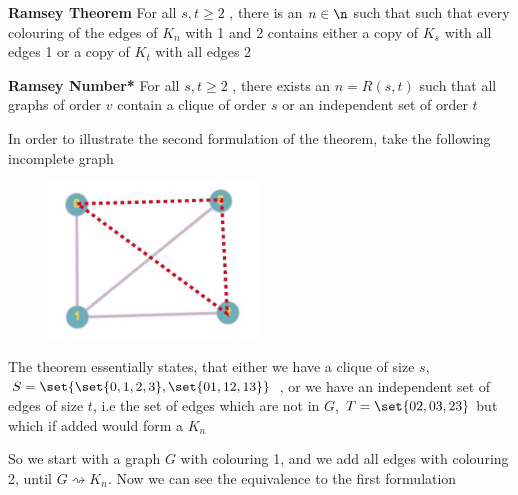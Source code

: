 \documentclass[english,course]{Notes}
\begin{document}
{{\begin{theorem}
\textbf{Ramsey Theorem} For all $s,t \geq 2$ , there is an $n \in \n$ such that such that every colouring of the edges of $K_{n}$ with 1 and 2 contains either a copy of $K_{s}$ with all edges 1 or a copy of $K_{t}$ with all edges 2
\end{theorem}

\begin{theorem}
\textbf{Ramsey Number*} For all $s,t \geq 2$ , there exists an $n=R(s,t)$ such that all graphs of order $v$ contain a clique of order $s$ or an independent set of order $t$
\end{theorem}

\par{In order to illustrate the second formulation of the theorem, take the following incomplete graph}




\begin{figure}[ht]
\centering
\includegraphics[width=0.5\textwidth]{ramsey.png}
\end{figure}

\par{The theorem essentially states, that either we have a clique of size $s$, $S = \set{\set{0,1,2,3},\set{01,12,13}}$ , or we have an independent set of edges of size $t$, i.e the set of edges which are not in $G$, $T = \set{02, 03, 23}$ but which if added would form a $K_{n}$}
\par{So we start with a graph $G$ with  colouring 1, and we add all edges with colouring 2, until $G \rightsquigarrow K_{n}$. Now we can see the equivalence to the first formulation}



}}
\end{document}

